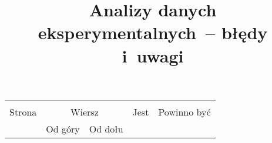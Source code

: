 \documentclass[a4paper,11pt]{article}
\title{Analizy danych eksperymentalnych~-- błędy i~uwagi}
\begin{document}





\maketitle %


















\begin{center}

  \begin{tabular}{|c|c|c|c|c|}
    \hline
    & \multicolumn{2}{c|}{} & & \\
    Strona & \multicolumn{2}{c|}{Wiersz} & Jest
                              & Powinno być \\ \cline{2-3}
    & Od góry & Od dołu & & \\
    \hline
    \hline
  \end{tabular}

\end{center}
\end{document}
